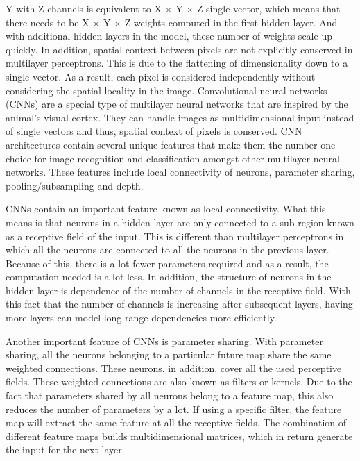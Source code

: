 \documentclass[letterpaper, 10 pt, conference]{ieeeconf}  %
\begin{document}
 Y with Z channels is equivalent to X $\times$ Y $\times$ Z single vector, which means that there needs to be X $\times$ Y $\times$ Z weights computed in the first hidden layer. And with additional hidden layers in the model, these number of weights scale up quickly. In addition, spatial context between pixels are not explicitly conserved in multilayer perceptrons. This is due to the flattening of dimensionality down to a single vector. As a result, each pixel is considered independently without considering the spatial locality in the image. Convolutional neural networks (CNNs) are a special type of multilayer neural networks that are inspired by the animal’s visual cortex. They can handle images as multidimensional input instead of single vectors and thus, spatial context of pixels is conserved. CNN architectures contain several unique features that make them the number one choice for image recognition and classification amongst other multilayer neural networks. These features include local connectivity of neurons, parameter sharing, pooling/subsampling and depth.

CNNs contain an important feature known as local connectivity. What this means is that neurons in a hidden layer are only connected to a sub region known as a receptive field of the input. This is different than multilayer perceptrons in which all the neurons are connected to all the neurons in the previous layer. Because of this, there is a lot fewer parameters required and as a result, the computation needed is a lot less. In addition, the structure of neurons in the hidden layer is dependence of the number of channels in the receptive field. With this fact that the number of channels is increasing after subsequent layers, having more layers can model long range dependencies more efficiently.

Another important feature of CNNs is parameter sharing. With parameter sharing, all the neurons belonging to a particular future map share the same weighted connections. These neurons, in addition, cover all the used perceptive fields. These weighted connections are also known as filters or kernels. Due to the fact that parameters shared by all neurons belong to a feature map, this also reduces the number of parameters by a lot. If using a specific filter, the feature map will extract the same feature at all the receptive fields. The combination of different feature maps builds multidimensional matrices, which in return generate the input for the next layer.
\end{document}
